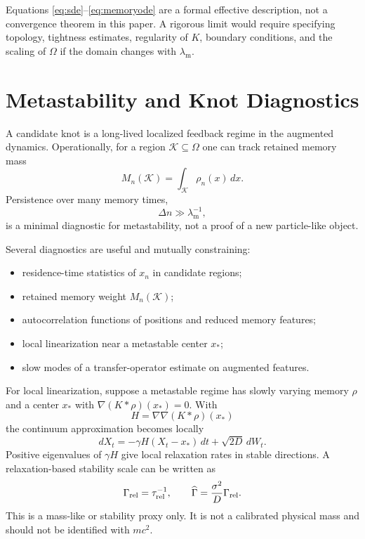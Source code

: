 \documentclass[preprint,amsmath,amssymb,aps,prd,nofootinbib,floatfix]{revtex4-2}
\begin{document}
Equations \eqref{eq:sde}--\eqref{eq:memoryode} are a formal effective
description, not a convergence theorem in this paper. A rigorous limit would
require specifying topology, tightness estimates, regularity of $K$, boundary
conditions, and the scaling of $\Omega$ if the domain changes with $\lambda_{\mathrm m}$.

\section{Metastability and Knot Diagnostics}

A candidate knot is a long-lived localized feedback regime in the augmented
dynamics. Operationally, for a region $\mathcal{K}\subseteq\Omega$ one can
track retained memory mass
\begin{equation}
M_n(\mathcal{K})=\int_{\mathcal{K}}\rho_n(x)\,dx.
\end{equation}
Persistence over many memory times,
\[
\Delta n\gg\lambda_{\mathrm m}^{-1},
\]
is a minimal diagnostic for metastability, not a proof of a new particle-like
object.

Several diagnostics are useful and mutually constraining:
\begin{itemize}
\item residence-time statistics of $x_n$ in candidate regions;
\item retained memory weight $M_n(\mathcal{K})$;
\item autocorrelation functions of positions and reduced memory features;
\item local linearization near a metastable center $x_*$;
\item slow modes of a transfer-operator estimate on augmented features.
\end{itemize}

For local linearization, suppose a metastable regime has slowly varying memory
$\rho$ and a center $x_*$ with $\nabla(K*\rho)(x_*)=0$. With
\[
H=\nabla\nabla(K*\rho)(x_*)
\]
the continuum approximation becomes locally
\begin{equation}
dX_t=-\gamma H(X_t-x_*)\,dt+\sqrt{2D}\,dW_t.
\end{equation}
Positive eigenvalues of $\gamma H$ give local relaxation rates in stable
directions. A relaxation-based stability scale can be written as
\[
\Gamma_{\rm rel}=\tau_{\rm rel}^{-1},\qquad
\widehat\Gamma=\frac{\sigma^2}{D}\Gamma_{\rm rel}.
\]
This is a mass-like or stability proxy only. It is not a calibrated physical
mass and should not be identified with $mc^2$.
\end{document}
